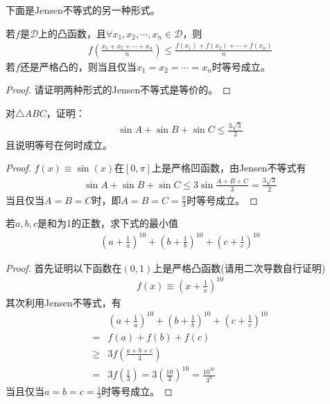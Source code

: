 下面是Jensen不等式的另一种形式。
\begin{theorem}[Jensen不等式]
  若$f$是$\mathcal{D}$上的凸函数，且$\forall x_1,x_2,\cdots,x_n\in\mathcal{D}$，则
  \begin{align}
    f\left(\frac{x_1+x_2+\cdots+x_n}{n}\right)\le\frac{f(x_1)+f(x_2)+\cdots+f(x_n)}{n}
  \end{align}
  若$f$还是严格凸的，则当且仅当$x_1=x_2=\cdots=x_n$时等号成立。
\end{theorem}

\begin{proof}
  {\color{red}请证明两种形式的Jensen不等式是等价的。}
\end{proof}

\begin{example}
  对$\triangle ABC$，证明：
  \begin{align*}
    \sin A + \sin B + \sin C \le \frac{3\sqrt3}{2}
  \end{align*}
  且说明等号在何时成立。
\end{example}

\begin{proof}
  $f(x)\equiv\sin(x)$在$[0,\pi]$上是严格凹函数，由Jensen不等式有
  \begin{align*}
    \sin A + \sin B + \sin C \le 3\sin\frac{A+B+C}{3} = \frac{3\sqrt3}{2}
  \end{align*}
  当且仅当$A=B=C$时，即$A=B=C=\frac\pi3$时等号成立。
\end{proof}

\begin{example}
  若$a,b,c$是和为1的正数，求下式的最小值
  \begin{align*}
    \left(a+\frac1a\right)^{10} + 
    \left(b+\frac1b\right)^{10} + 
    \left(c+\frac1c\right)^{10}
  \end{align*}
\end{example}

\begin{proof}
  首先证明以下函数在$(0,1)$上是严格凸函数({\color{red}请用二次导数自行证明})
  \begin{align*}
    f(x)\equiv\left(x+\frac1x\right)^{10}
  \end{align*}
  其次利用Jensen不等式，有
  \begin{align*}
    &\left(a+\frac1a\right)^{10} + 
    \left(b+\frac1b\right)^{10} + 
    \left(c+\frac1c\right)^{10}\\
    ={}  & f(a) + f(b) + f(c)\\
    \ge{}& 3f\left(\frac{a+b+c}3\right)\\
    ={}  & 3f\left(\frac13\right) = 3 \left(\frac{10}{3}\right)^{10} = \frac{10^{10}}{3^9}
  \end{align*}
  当且仅当$a=b=c=\frac13$时等号成立。
\end{proof}